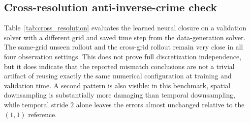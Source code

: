 \documentclass[preprint,12pt]{elsarticle}
\begin{document}
\begin{table}[t]
\centering
\small
{}
\caption{Case~Exp Stage~2 replacement check. On this mismatch stress test, replacing the restricted symbolic family with PySR leaves the qualitative conclusion unchanged: Stage~2 still preserves the constitutive bias inherited from the neural surrogate, especially under observation noise.}
\label{tab:pysr_check}
\end{table}

\subsection{Cross-resolution anti-inverse-crime check}

Table~\ref{tab:cross_resolution} evaluates the learned neural closure on a validation solver with a different grid and saved time step from the data-generation solver. The same-grid unseen rollout and the cross-grid rollout remain very close in all four observation settings. This does not prove full discretization independence, but it does indicate that the reported mismatch conclusions are not a trivial artifact of reusing exactly the same numerical configuration at training and validation time. A second pattern is also visible: in this benchmark, spatial downsampling is substantially more damaging than temporal downsampling, while temporal stride $2$ alone leaves the errors almost unchanged relative to the $(1,1)$ reference.
\end{document}
